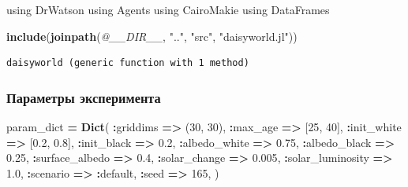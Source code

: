 \documentclass[
  english,
  russian,
  12pt,
  a4paper,
  DIV=11,
  numbers=noendperiod]{scrreprt}
\newenvironment{Shaded}{\begin{snugshade}}{\end{snugshade}}
\newcommand{\BuiltInTok}[1]{#1}
\newcommand{\FloatTok}[1]{\textcolor[rgb]{0.00,0.00,0.81}{#1}}
\newcommand{\FunctionTok}[1]{\textcolor[rgb]{0.13,0.29,0.53}{\textbf{#1}}}
\newcommand{\ImportTok}[1]{#1}
\newcommand{\NormalTok}[1]{#1}
\newcommand{\OperatorTok}[1]{\textcolor[rgb]{0.81,0.36,0.00}{\textbf{#1}}}
\newcommand{\PreprocessorTok}[1]{\textcolor[rgb]{0.56,0.35,0.01}{\textit{#1}}}
\newcommand{\StringTok}[1]{\textcolor[rgb]{0.31,0.60,0.02}{#1}}
\begin{document}
\begin{Shaded}
\begin{Highlighting}[]
\ImportTok{using} \BuiltInTok{DrWatson}
\ImportTok{using} \BuiltInTok{Agents}
\ImportTok{using} \BuiltInTok{CairoMakie}
\ImportTok{using} \BuiltInTok{DataFrames}

\FunctionTok{include}\NormalTok{(}\FunctionTok{joinpath}\NormalTok{(}\PreprocessorTok{@\_\_DIR\_\_}\NormalTok{, }\StringTok{".."}\NormalTok{, }\StringTok{"src"}\NormalTok{, }\StringTok{"daisyworld.jl"}\NormalTok{))}
\end{Highlighting}
\end{Shaded}

\begin{verbatim}
daisyworld (generic function with 1 method)
\end{verbatim}

\subsubsection{Параметры
эксперимента}\label{ux43fux430ux440ux430ux43cux435ux442ux440ux44b-ux44dux43aux441ux43fux435ux440ux438ux43cux435ux43dux442ux430}

\begin{Shaded}
\begin{Highlighting}[]
\NormalTok{param\_dict }\OperatorTok{=} \FunctionTok{Dict}\NormalTok{(}
    \OperatorTok{:}\NormalTok{griddims }\OperatorTok{=\textgreater{}}\NormalTok{ (}\FloatTok{30}\NormalTok{, }\FloatTok{30}\NormalTok{),}
    \OperatorTok{:}\NormalTok{max\_age }\OperatorTok{=\textgreater{}}\NormalTok{ [}\FloatTok{25}\NormalTok{, }\FloatTok{40}\NormalTok{],}
    \OperatorTok{:}\NormalTok{init\_white }\OperatorTok{=\textgreater{}}\NormalTok{ [}\FloatTok{0.2}\NormalTok{, }\FloatTok{0.8}\NormalTok{],}
    \OperatorTok{:}\NormalTok{init\_black }\OperatorTok{=\textgreater{}} \FloatTok{0.2}\NormalTok{,}
    \OperatorTok{:}\NormalTok{albedo\_white }\OperatorTok{=\textgreater{}} \FloatTok{0.75}\NormalTok{,}
    \OperatorTok{:}\NormalTok{albedo\_black }\OperatorTok{=\textgreater{}} \FloatTok{0.25}\NormalTok{,}
    \OperatorTok{:}\NormalTok{surface\_albedo }\OperatorTok{=\textgreater{}} \FloatTok{0.4}\NormalTok{,}
    \OperatorTok{:}\NormalTok{solar\_change }\OperatorTok{=\textgreater{}} \FloatTok{0.005}\NormalTok{,}
    \OperatorTok{:}\NormalTok{solar\_luminosity }\OperatorTok{=\textgreater{}} \FloatTok{1.0}\NormalTok{,}
    \OperatorTok{:}\NormalTok{scenario }\OperatorTok{=\textgreater{}} \OperatorTok{:}\NormalTok{default,}
    \OperatorTok{:}\NormalTok{seed }\OperatorTok{=\textgreater{}} \FloatTok{165}\NormalTok{,}
\NormalTok{)}
\end{Highlighting}
\end{Shaded}
\end{document}
